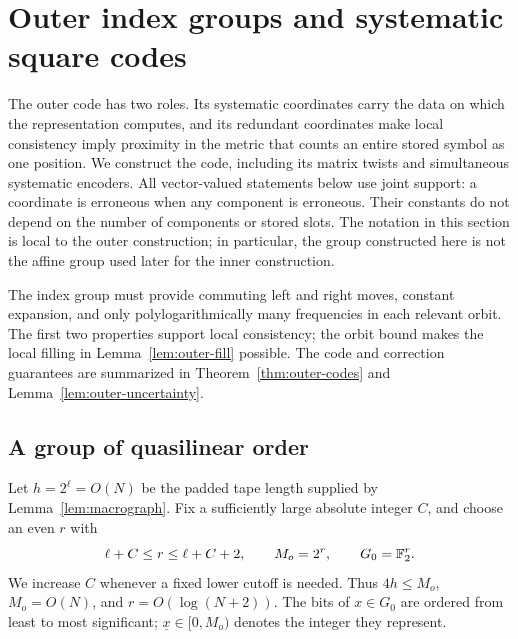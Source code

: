 \section{Outer index groups and systematic square codes}\label{sec:outer-codes}

The outer code has two roles.  Its systematic coordinates carry the data
on which the representation computes, and its redundant coordinates make
local consistency imply proximity in the metric that counts an entire
stored symbol as one position.  We construct the code, including its
matrix twists and simultaneous systematic encoders.  All vector-valued
statements below use joint support: a coordinate is erroneous when any
component is erroneous.  Their constants do not depend on the number of
components or stored slots.  The notation in this section is local to the
outer construction; in particular, the group constructed here is not the
affine group used later for the inner construction.

The index group must provide commuting left and right moves, constant
expansion, and only polylogarithmically many frequencies in each relevant
orbit. The first two properties support local consistency; the orbit
bound makes the local filling in Lemma~\ref{lem:outer-fill} possible.
The code and correction guarantees are summarized in
Theorem~\ref{thm:outer-codes} and Lemma~\ref{lem:outer-uncertainty}.

\subsection{A group of quasilinear order}

Let $h=2^\ell=O(N)$ be the padded tape length supplied by
Lemma~\ref{lem:macrograph}.  Fix a sufficiently large absolute integer
$C$, and choose an even $r$ with
\begin{equation}\label{oc:outer-size}
 \ell+C\le r\le\ell+C+2,
 \qquad M_o=2^r,\qquad G_0=\mathbb{F}_2^r.
\end{equation}
We increase $C$ whenever a fixed lower cutoff is needed.  Thus $4h\le M_o$,
$M_o=O(N)$, and $r=O(\log(N+2))$.  The bits of $x\in G_0$ are ordered
from least to most significant; $\underline{x}\in[0,M_o)$ denotes the
integer they represent.

